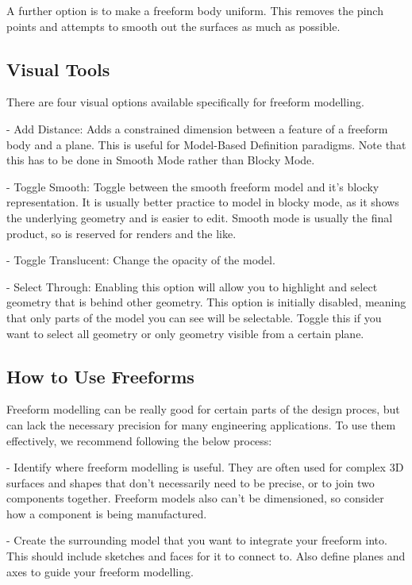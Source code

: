 A further option is to make a freeform body uniform. This removes the pinch points and attempts to smooth out the surfaces as much as possible.

\subsection{Visual Tools}

There are four visual options available specifically for freeform modelling.

- Add Distance: Adds a constrained dimension between a feature of a freeform body and a plane. This is useful for Model-Based Definition paradigms. Note that this has to be done in Smooth Mode rather than Blocky Mode.

- Toggle Smooth: Toggle between the smooth freeform model and it's blocky representation. It is usually better practice to model in blocky mode, as it shows the underlying geometry and is easier to edit. Smooth mode is usually the final product, so is reserved for renders and the like.

- Toggle Translucent: Change the opacity of the model. 

- Select Through: Enabling this option will allow you to highlight and select geometry that is behind other geometry. This option is initially disabled, meaning that only parts of the model you can see will be selectable. Toggle this if you want to select all geometry or only geometry visible from a certain plane.

\subsection{How to Use Freeforms}

Freeform modelling can be really good for certain parts of the design proces, but can lack the necessary precision for many engineering applications. To use them effectively, we recommend following the below process:

- Identify where freeform modelling is useful. They are often used for complex 3D surfaces and shapes that don't necessarily need to be precise, or to join two components together. Freeform models also can't be dimensioned, so consider how a component is being manufactured.

- Create the surrounding model that you want to integrate your freeform into. This should include sketches and faces for it to connect to. Also define planes and axes to guide your freeform modelling.

